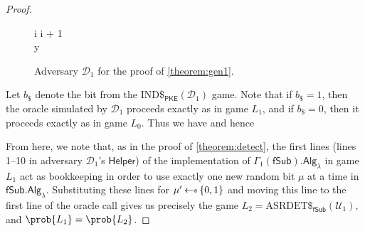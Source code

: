 \begin{proof}
\begin{figure}
\begin{pchstack}
\begin{pcvstack}
{	\pcind i \leftarrow i + 1 \\
	\pcreturn y
}
\pcvspace
{}
\end{pcvstack}
\end{pchstack}
\caption[Adversary $\mathcal{D}_1$ for the proof of \autoref{theorem:gen1}]{Adversary $\mathcal{D}_1$ for the proof of \autoref{theorem:gen1}.}
\label{game:D1}
\end{figure}

Let $b_\$$ denote the bit from the IND\$$_\mathsf{PKE}(\mathcal{D}_1)$ game. Note that if $b_\$=1$, then the oracle simulated by $\mathcal{D}_1$ proceeds exactly as in game $L_1$, and if  $b_\$=0$, then it proceeds exactly as in game $L_0$. Thus we have
and hence

From here, we note that, as in the proof of \autoref{theorem:detect}, the first lines (lines 1--10 in adversary $\mathcal{D}_1$'s $\mathsf{Helper}$) of the implementation of $\Gamma_1(\mathsf{fSub}).\mathsf{Alg}_\lambda$ in game $L_1$ act as bookkeeping in order to use exactly one new random bit $\mu$ at a time in $\mathsf{fSub}.\mathsf{Alg}_\lambda$. Substituting these lines for $\mu' \sample \{0,1\}$ and moving this line to the first line of the oracle call gives us precisely the game $L_2=\mathrm{ASRDET}\$_{\mathsf{fSub}}(\mathcal{U}_1) $, and $\prob{L_1}=\prob{L_2}$.


\end{proof}
